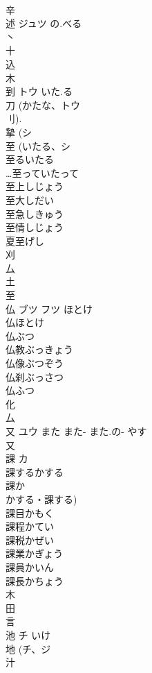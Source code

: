 \documentclass[8pt]{extreport}
\begin{document}
\begin{CJK}{UTF8}{min}
\\	辛 
\\	述	ジュツ	の.べる	
\\	丶 
\\	十 
\\	込 
\\	木 
\\	到	トウ	いた.る	
\\	刀 (かたな、トウ 
\\	刂). 
\\	摯 (シ 
\\	至 (いたる、シ 
\\	至るいたる
\\	…至っていたって
\\	至上しじょう
\\	至大しだい
\\	至急しきゅう
\\	至情しじょう
\\	夏至げし
\\	刈 
\\	厶 
\\	土 
\\	至 
\\	仏	ブツ フツ	ほとけ	
\\	仏ほとけ 
\\	仏ぶつ 
\\	仏教ぶっきょう 
\\	仏像ぶつぞう 
\\	仏刹ぶっさつ 
\\	仏ふつ 
\\	化 
\\	厶 
\\	又	ユウ	また また- また.の- やす	
\\	又 
\\	課	カ		
\\	課するかする 
\\	課か 
\\	かする・課する) 
\\	課目かもく 
\\	課程かてい 
\\	課税かぜい 
\\	課業かぎょう 
\\	課員かいん 
\\	課長かちょう 
\\	木 
\\	田 
\\	言 
\\	池	チ	いけ	
\\	地 (チ、ジ 
\\	汁 

\end{CJK}
\end{document}
